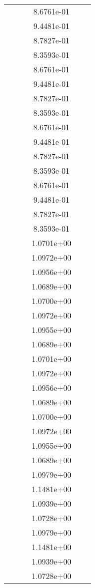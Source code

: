 \begin{xltabular}{\textwidth}{r|rS[table-format=1.3e+2]S[table-format=1.4e+2]S[table-format=1.4e+2]S[table-format=-1.5]}
&  &  & 8.6761e-01 & & \\
&  &  & 9.4481e-01 & & \\
&  &  & 8.7827e-01 & & \\
&  &  & 8.3593e-01 & & \\
&  &  & 8.6761e-01 & & \\
&  &  & 9.4481e-01 & & \\
&  &  & 8.7827e-01 & & \\
&  &  & 8.3593e-01 & & \\
&  &  & 8.6761e-01 & & \\
&  &  & 9.4481e-01 & & \\
&  &  & 8.7827e-01 & & \\
&  &  & 8.3593e-01 & & \\
&  &  & 8.6761e-01 & & \\
&  &  & 9.4481e-01 & & \\
&  &  & 8.7827e-01 & & \\
&  &  & 8.3593e-01 & & \\
&  &  & 1.0701e+00 & & \\
&  &  & 1.0972e+00 & & \\
&  &  & 1.0956e+00 & & \\
&  &  & 1.0689e+00 & & \\
&  &  & 1.0700e+00 & & \\
&  &  & 1.0972e+00 & & \\
&  &  & 1.0955e+00 & & \\
&  &  & 1.0689e+00 & & \\
&  &  & 1.0701e+00 & & \\
&  &  & 1.0972e+00 & & \\
&  &  & 1.0956e+00 & & \\
&  &  & 1.0689e+00 & & \\
&  &  & 1.0700e+00 & & \\
&  &  & 1.0972e+00 & & \\
&  &  & 1.0955e+00 & & \\
&  &  & 1.0689e+00 & & \\
&  &  & 1.0979e+00 & & \\
&  &  & 1.1481e+00 & & \\
&  &  & 1.0939e+00 & & \\
&  &  & 1.0728e+00 & & \\
&  &  & 1.0979e+00 & & \\
&  &  & 1.1481e+00 & & \\
&  &  & 1.0939e+00 & & \\
&  &  & 1.0728e+00 & & \\

\end{xltabular}
